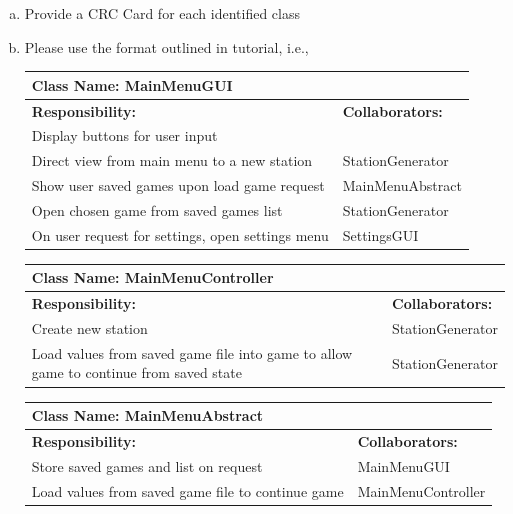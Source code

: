 \documentclass[]{article}
\begin{document}
\begin{enumerate}[a)]
	\item Provide a CRC Card for each identified class
	\item Please use the format outlined in tutorial, i.e., 
	\begin{table}[ht]
		\centering
		\begin{tabular}{|p{5cm}|p{5cm}|}
		\hline 
		 \multicolumn{2}{|l|}{\textbf{Class Name: MainMenuGUI}} \\
		\hline
		\textbf{Responsibility:} & \textbf{Collaborators:} \\
		\hline
		Display buttons for user input & \\
		\hline
		Direct view from main menu to a new station & StationGenerator\\
		\hline
		Show user saved games upon load game request & MainMenuAbstract \\
		\hline
		Open chosen game from saved games list  & StationGenerator \\
		\hline
		On user request for settings, open settings menu & SettingsGUI\\
		\hline
		\end{tabular}
	\end{table}
	\begin{table}[ht]
		\centering
		\begin{tabular}{|p{5cm}|p{5cm}|}
		\hline 
		 \multicolumn{2}{|l|}{\textbf{Class Name: MainMenuController}} \\
		\hline
		\textbf{Responsibility:} & \textbf{Collaborators:} \\
		\hline
		Create new station & StationGenerator\\
		\hline
		Load values from saved game file into game to allow game to continue from saved state & StationGenerator\\
		\hline
		\end{tabular}
	\end{table}
	\begin{table}[ht]
		\centering
		\begin{tabular}{|p{5cm}|p{5cm}|}
		\hline 
		 \multicolumn{2}{|l|}{\textbf{Class Name: MainMenuAbstract}} \\
		\hline
		\textbf{Responsibility:} & \textbf{Collaborators:} \\
		\hline
		Store saved games and list on request & MainMenuGUI\\
		\hline
		Load values from saved game file to continue game & MainMenuController\\

\end{tabular}
\end{table}
\end{enumerate}
\end{document}
